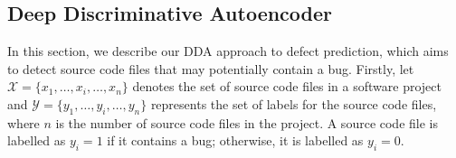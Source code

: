 

\subsection{Deep Discriminative Autoencoder}
\label{sec:semi}
In this section, we describe our DDA approach to defect prediction, which aims to detect source code files that may potentially contain a bug. Firstly, let $\mathcal{X}=\{x_1, \dots, x_i, \dots, x_n\}$ denotes the set of source code files in a software project and $\mathcal{Y}=\{y_1, \dots, y_i, \dots, y_n\}$ represents the set of labels for the source code files, where $n$ is the number of source code files in the project. A source code file is labelled as $y_{i}=1$ if it contains a bug; otherwise, it is labelled as $y_i = 0$. 

